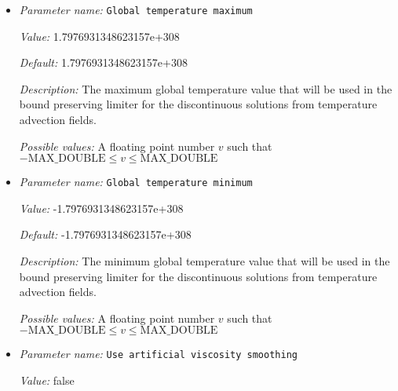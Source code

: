 \begin{itemize}
{\it Description:} The minimum global composition value that will be used in the bound preserving limiter for the discontinuous solutions from composition advection fields. The number of the input 'Global composition minimum' values separated by ',' has to be the same as the number of the compositional fields


{\it Possible values:} A list of 0 to 4294967295 elements where each element is [A floating point number $v$ such that $-\text{MAX\_DOUBLE} \leq v \leq \text{MAX\_DOUBLE}$]
\item {\it Parameter name:} {\tt Global temperature maximum}
\label{parameters:Discretization/Stabilization parameters/Global temperature maximum}


{\it Value:} 1.7976931348623157e+308


{\it Default:} 1.7976931348623157e+308


{\it Description:} The maximum global temperature value that will be used in the bound preserving limiter for the discontinuous solutions from temperature advection fields.


{\it Possible values:} A floating point number $v$ such that $-\text{MAX\_DOUBLE} \leq v \leq \text{MAX\_DOUBLE}$
\item {\it Parameter name:} {\tt Global temperature minimum}
\label{parameters:Discretization/Stabilization parameters/Global temperature minimum}


{\it Value:} -1.7976931348623157e+308


{\it Default:} -1.7976931348623157e+308


{\it Description:} The minimum global temperature value that will be used in the bound preserving limiter for the discontinuous solutions from temperature advection fields.


{\it Possible values:} A floating point number $v$ such that $-\text{MAX\_DOUBLE} \leq v \leq \text{MAX\_DOUBLE}$
\item {\it Parameter name:} {\tt Use artificial viscosity smoothing}
\label{parameters:Discretization/Stabilization parameters/Use artificial viscosity smoothing}


{\it Value:} false



\end{itemize}
